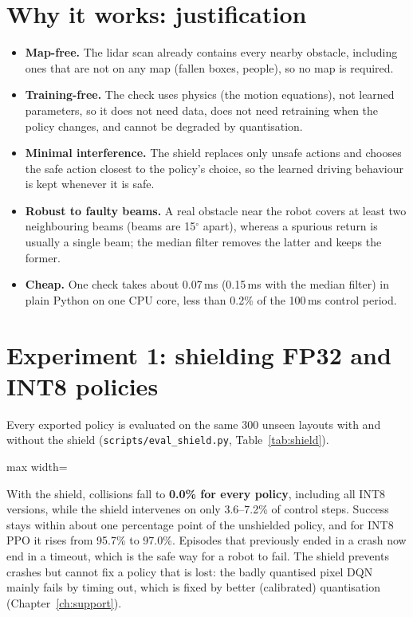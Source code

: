 \documentclass[12pt,a4paper,oneside]{report}
\newcommand{\fit}[1]{\begin{adjustbox}{max width=\linewidth}\end{adjustbox}}
\begin{document}
\section{Why it works: justification}
\begin{itemize}
\item \textbf{Map-free.} The lidar scan already contains every nearby obstacle, including ones that are not on any
map (fallen boxes, people), so no map is required.
\item \textbf{Training-free.} The check uses physics (the motion equations), not learned parameters, so it does not
need data, does not need retraining when the policy changes, and cannot be degraded by quantisation.
\item \textbf{Minimal interference.} The shield replaces only unsafe actions and chooses the safe action closest to
the policy's choice, so the learned driving behaviour is kept whenever it is safe.
\item \textbf{Robust to faulty beams.} A real obstacle near the robot covers at least two neighbouring beams (beams
are 15$^\circ$ apart), whereas a spurious return is usually a single beam; the median filter removes the latter and
keeps the former.
\item \textbf{Cheap.} One check takes about 0.07\,ms (0.15\,ms with the median filter) in plain Python on one CPU
core, less than 0.2\% of the 100\,ms control period.
\end{itemize}

\section{Experiment 1: shielding FP32 and INT8 policies}
Every exported policy is evaluated on the same 300 unseen layouts with and without the shield
(\texttt{scripts/eval\_shield.py}, Table~\ref{tab:shield}).

\begin{table}[H]\centering\small\caption{Effect of the shield on FP32 and INT8 policies (300 unseen layouts).}\label{tab:shield}\fit{tab_shield}\end{table}

With the shield, collisions fall to \textbf{0.0\% for every policy}, including all INT8 versions, while the shield
intervenes on only 3.6--7.2\% of control steps. Success stays within about one percentage point of the unshielded
policy, and for INT8 PPO it rises from 95.7\% to 97.0\%. Episodes that previously ended in a crash now end in a
timeout, which is the safe way for a robot to fail. The shield prevents crashes but cannot fix a policy that is lost:
the badly quantised pixel DQN mainly fails by timing out, which is fixed by better (calibrated) quantisation
(Chapter~\ref{ch:support}).
\end{document}
